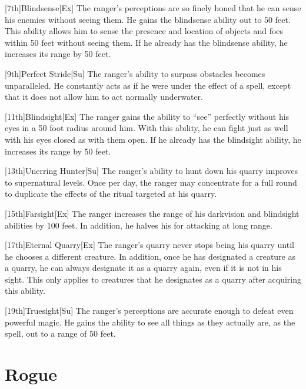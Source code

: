 [7th]{Blindsense}[Ex]
The ranger's perceptions are so finely honed that he can sense his enemies without seeing them.
He gains the blindsense ability out to 50 feet.
This ability allows him to sense the presence and location of objects and foes within 50 feet without seeing them.
If he already has the blindsense ability, he increases its range by 50 feet.

[9th]{Perfect Stride}[Su]
The ranger's ability to surpass obstacles becomes unparalleled.
He constantly acts as if he were under the effect of a  spell, except that it does not allow him to act normally underwater.

[11th]{Blindsight}[Ex]
The ranger gains the ability to ``see'' perfectly without his eyes in a 50 foot radius around him.
With this ability, he can fight just as well with his eyes closed as with them open.
If he already has the blindsight ability, he increases its range by 50 feet.

[13th]{Unerring Hunter}[Su]
The ranger's ability to hunt down his quarry improves to supernatural levels.
Once per day, the ranger may concentrate for a full round to duplicate the effects of the  ritual targeted at his quarry.

[15th]{Farsight}[Ex]
The ranger increases the range of his darkvision and blindsight abilities by 100 feet.
In addition, he halves his  for attacking at long range.

[17th]{Eternal Quarry}[Ex]
The ranger's quarry never stops being his quarry until he chooses a different creature.
In addition, once he has designated a creature as a quarry, he can always designate it as a quarry again, even if it is not in his sight.
This only applies to creatures that he designates as a quarry after acquiring this ability.

[19th]{Truesight}[Su]
The ranger's perceptions are accurate enough to defeat even powerful magic.
He gains the ability to see all things as they actually are, as the  spell, out to a range of 50 feet.

\section{Rogue}

